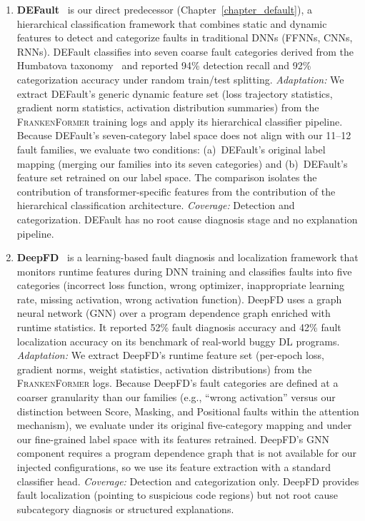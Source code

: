 \begin{enumerate}[label=(\roman*),nosep]

\item \textbf{DEFault}~\cite{default} is our direct predecessor (Chapter~\ref{chapter_default}), a hierarchical classification framework that combines static and dynamic features to detect and categorize faults in traditional DNNs (FFNNs, CNNs, RNNs). DEFault classifies into seven coarse fault categories derived from the Humbatova taxonomy~\cite{humbatova2020taxonomy} and reported 94\% detection recall and 92\% categorization accuracy under random train/test splitting. \emph{Adaptation:} We extract DEFault's generic dynamic feature set (loss trajectory statistics, gradient norm statistics, activation distribution summaries) from the \textsc{FrankenFormer} training logs and apply its hierarchical classifier pipeline. Because DEFault's seven-category label space does not align with our 11--12 fault families, we evaluate two conditions: (a)~DEFault's original label mapping (merging our families into its seven categories) and (b)~DEFault's feature set retrained on our label space. The comparison isolates the contribution of transformer-specific features from the contribution of the hierarchical classification architecture. \emph{Coverage:} Detection and categorization. DEFault has no root cause diagnosis stage and no explanation pipeline.

\item \textbf{DeepFD}~\cite{deepfd} is a learning-based fault diagnosis and localization framework that monitors runtime features during DNN training and classifies faults into five categories (incorrect loss function, wrong optimizer, inappropriate learning rate, missing activation, wrong activation function). DeepFD uses a graph neural network (GNN) over a program dependence graph enriched with runtime statistics. It reported 52\% fault diagnosis accuracy and 42\% fault localization accuracy on its benchmark of real-world buggy DL programs. \emph{Adaptation:} We extract DeepFD's runtime feature set (per-epoch loss, gradient norms, weight statistics, activation distributions) from the \textsc{FrankenFormer} logs. Because DeepFD's fault categories are defined at a coarser granularity than our families (e.g., ``wrong activation'' versus our distinction between Score, Masking, and Positional faults within the attention mechanism), we evaluate under its original five-category mapping and under our fine-grained label space with its features retrained. DeepFD's GNN component requires a program dependence graph that is not available for our injected configurations, so we use its feature extraction with a standard classifier head. \emph{Coverage:} Detection and categorization only. DeepFD provides fault localization (pointing to suspicious code regions) but not root cause subcategory diagnosis or structured explanations.


\end{enumerate}
